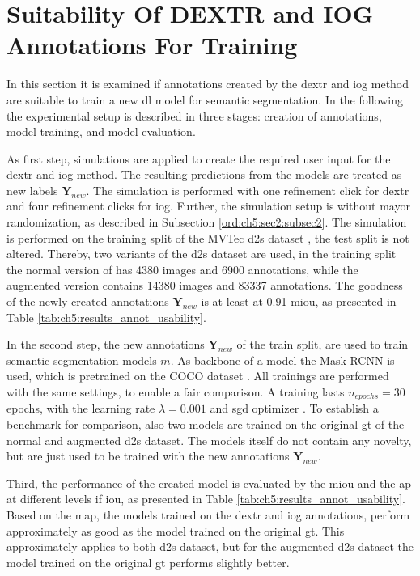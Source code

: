 
\section{Suitability Of DEXTR and IOG Annotations For Training} \label{ord:ch5:sec5_retrain}
In this section it is examined if annotations created by the \gls{dextr} and \gls{iog} method are suitable to train a new \gls{dl} model for semantic segmentation. %
In the following the experimental setup is described in three stages: creation of annotations, model training, and model evaluation.
 
As first step, simulations are applied to create the required user input for the \gls{dextr} and \gls{iog} method.
The resulting predictions from the models are treated as new labels $ \textbf{Y}_{new} $. 
The simulation is performed with one refinement click for \gls{dextr} and four refinement clicks for \gls{iog}.
Further, the simulation setup is without mayor randomization, as described in Subsection \ref{ord:ch5:sec2:subsec2}.
The simulation is performed on the training split of the MVTec \gls{d2s} dataset \cite{Paddo18-D2S}, the test split is not altered.
Thereby, two variants of the \gls{d2s} dataset are used, in the training split the normal version of has 4380 images and 6900 annotations, while the augmented version contains 14380 images and 83337 annotations.
The goodness of the newly created annotations $ \textbf{Y}_{new} $ is at least at 0.91 \gls{miou}, as presented in Table \ref{tab:ch5:results_annot_usability}.

In the second step, the new annotations $ \textbf{Y}_{new} $ of the train split, are used to train semantic segmentation models $ m $.
As backbone of a model the Mask-RCNN \cite{He17-MaskR-CNN} is used, which is pretrained on the COCO dataset \cite{Lin14-Coco}.
All trainings are performed with the same settings, to enable a fair comparison.
A training lasts $ n_{epochs} = 30 $ epochs, with the learning rate $ \lambda = 0.001 $ and \gls{sgd} optimizer \cite{Ruder16-SGD}.
To establish a benchmark for comparison, also two models are trained on the original \gls{gt} of the normal and augmented \gls{d2s} dataset.
The models itself do not contain any novelty, but are just used to be trained with the new annotations $ \textbf{Y}_{new} $.

Third, the performance of the created model is evaluated by the \gls{miou} and the \gls{ap} at different levels if \gls{iou}, as presented in Table \ref{tab:ch5:results_annot_usability}.
Based on the \gls{map}, the models trained on the \gls{dextr} and \gls{iog} annotations, perform approximately as good as the model trained on the original \gls{gt}.
This approximately applies to both \gls{d2s} dataset, but for the augmented \gls{d2s} dataset the model trained on the original \gls{gt} performs slightly better.

